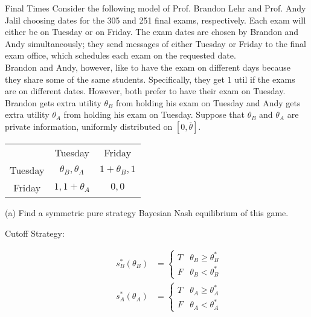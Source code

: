 \documentclass[9pt]{extarticle}
\begin{document}
  \begin{problem}{Final Times}
    Consider the following model of Prof. Brandon Lehr and Prof. Andy Jalil choosing dates for the 305 and 251 final exams, respectively. Each exam will either be on Tuesday or on Friday. The exam dates are chosen by Brandon and Andy simultaneously; they send messages of either Tuesday or Friday to the final exam office, which schedules each exam on the requested date.\\

    Brandon and Andy, however, like to have the exam on different days because they share some of the same students. Specifically, they get $1$ util if the exams are on different dates. However, both prefer to have their exam on Tuesday. Brandon gets extra utility $\theta_B$ from holding his exam on Tuesday and Andy gets extra utility $\theta_A$ from holding his exam on Tuesday. Suppose that $\theta_B$ and $\theta_A$ are private information, uniformly distributed on $[0, \overline{\theta}]$.
    \begin{center}
      \renewcommand{\arraystretch}{1.5}
      \begin{tabular}{c|c|c|}
        \multicolumn{1}{c}{} & \multicolumn{1}{c}{Tuesday} & \multicolumn{1}{c}{Friday}\\
        \cline{2-3}
        Tuesday & $\theta_B,\theta_A$ & $1 + \theta_B,1$\\
        \cline{2-3}
        Friday & $1,1+\theta_A$ & $0,0$\\
        \cline{2-3}
      \end{tabular}
    \end{center}
    \tcblower
    \begin{problem}{(a)}
      Find a symmetric pure strategy Bayesian Nash equilibrium of this game.
      \tcblower
      \begin{description}
        \item[Cutoff Strategy:]
          \begin{align*}
            s_{B}^{\ast}(\theta_B) &= \begin{cases}
              T & \theta_{B} \geq \theta_B^{\ast}\\
              F & \theta_{B} < \theta_{B}^{\ast}
            \end{cases}\\
              s_{A}^{\ast}(\theta_A) &= \begin{cases}
                T & \theta_{A} \geq \theta_{A}^{\ast}\\
                F & \theta_{A} < \theta_{A}^{\ast}

\end{cases}
\end{align*}
\end{description}
\end{problem}
\end{problem}
\end{document}

